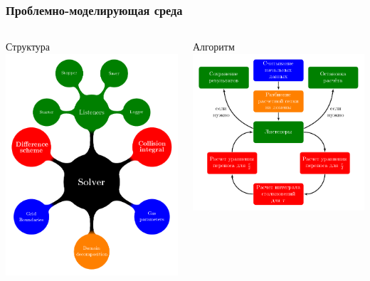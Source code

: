 \documentclass[ucs]{beamer}
\begin{document}
\begin{frame}
	\frametitle{Проблемно-моделирующая среда}
	\begin{columns}
		\begin{center}
			Структура\\
			\includegraphics[width=\textwidth]{pics/pse1}
		\end{center}
		\begin{center}
			Алгоритм\\
			\includegraphics[width=\textwidth]{pics/pse2}

\end{center}
\end{columns}
\end{frame}
\end{document}
